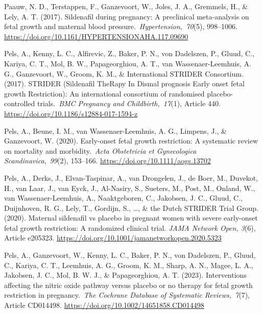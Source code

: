 \documentclass[authordate, reflection,issue]{jote-new-article}
\begin{document}
	Paauw, N. D., Terstappen, F., Ganzevoort, W., Joles, J. A., Gremmels, H., \& Lely, A. T. (2017). Sildenafil during pregnancy: A preclinical meta-analysis on fetal growth and maternal blood pressure. \emph{Hypertension, 70}(5), 998--1006. \url{https://doi.org/10.1161/HYPERTENSIONAHA.117.09690}







	Pels, A., Kenny, L. C., Alfirevic, Z., Baker, P. N., von Dadelszen, P., Gluud, C., Kariya, C. T., Mol, B. W., Papageorghiou, A. T., van Wassenaer-Leemhuis, A. G., Ganzevoort, W., Groom, K. M., \& International STRIDER Consortium. (2017). STRIDER (Sildenafil TheRapy In Dismal prognosis Early onset fetal growth Restriction): An international consortium of randomised placebo-controlled trials. \emph{BMC Pregnancy and Childbirth, 17}(1), Article 440. \url{https://doi.org/10.1186/s12884-017-1594-z}







	Pels, A., Beune, I. M., van Wassenaer-Leemhuis, A. G., Limpens, J., \& Ganzevoort, W. (2020). Early-onset fetal growth restriction: A systematic review on mortality and morbidity. \emph{Acta Obstetricia et Gynecologica Scandinavica}, \emph{99}(2), 153--166. \url{https://doi.org/10.1111/aogs.13702}







	Pels, A., Derks, J., Elvan-Taspinar, A., van Drongelen, J., de Boer, M., Duvekot, H., van Laar, J., van Eyck, J., Al-Nasiry, S., Sueters, M., Post, M., Onland, W., van Wassenaer-Leemhuis, A., Naaktgeboren, C., Jakobsen, J. C., Gluud, C., Duijnhoven, R. G., Lely, T., Gordijn, S., …, \& the Dutch STRIDER Trial Group. (2020). Maternal sildenafil vs placebo in pregnant women with severe early-onset fetal growth restriction: A randomized clinical trial. \emph{JAMA Network Open, 3}(6), Article e205323. \url{https://doi.org/10.1001/jamanetworkopen.2020.5323}







	Pels, A., Ganzevoort, W., Kenny, L. C., Baker, P. N., von Dadelszen, P., Gluud, C., Kariya, C. T., Leemhuis, A. G., Groom, K. M., Sharp, A. N., Magee, L. A., Jakobsen, J. C., Mol, B. W. J., \& Papageorghiou, A. T. (2023). Interventions affecting the nitric oxide pathway versus placebo or no therapy for fetal growth restriction in pregnancy. \emph{The Cochrane Database of Systematic Reviews, 7}(7), Article CD014498. \url{https://doi.org/10.1002/14651858.CD014498}
\end{document}
